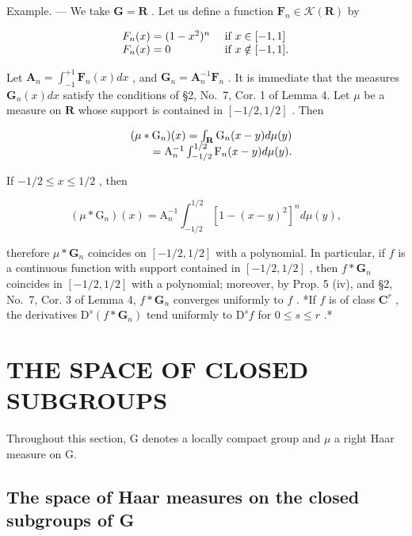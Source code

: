 Example. --- We take \(\mathbf{G} = \mathbf{R}\) . Let us define a function \(\mathbf{F}_n \in \mathcal{K}(\mathbf{R})\) by

\[
\begin{array}{l l} F _ {n} (x) = (1 - x ^ {2}) ^ {n} & \text { if } x \in [ - 1, 1 ] \\ F _ {n} (x) = 0 & \text { if } x \notin [ - 1, 1 ]. \end{array}
\]

Let \(\mathbf{A}_n = \int_{-1}^{+1}\mathbf{F}_n(x)dx\) , and \(\mathbf{G}_n = \mathbf{A}_n^{-1}\mathbf{F}_n\) . It is immediate that the measures \(\mathbf{G}_n(x)dx\) satisfy the conditions of §2, No.~7, Cor. 1 of Lemma 4. Let \(\mu\) be a measure on \(\mathbf{R}\) whose support is contained in \([-1/2, 1/2]\) . Then

\[
\begin{array}{r l} & {(\mu * \mathrm{G} _ {n}) (x) = \int_ {\mathbf {R}} \mathrm{G} _ {n} (x - y) d \mu (y)} \\ & {\qquad = \mathrm{A} _ {n} ^ {- 1} \int_ {- 1 / 2} ^ {1 / 2} \mathrm{F} _ {n} (x - y) d \mu (y).} \end{array}
\]

If \(-1 / 2\leqslant x\leqslant 1 / 2\) , then

\[
(\mu * \mathrm{G} _ {n}) (x) = \mathrm{A} _ {n} ^ {- 1} \int_ {- 1 / 2} ^ {1 / 2} [ 1 - (x - y) ^ {2} ] ^ {n} d \mu (y),
\]

therefore \(\mu * \mathbf{G}_n\) coincides on \([-1/2, 1/2]\) with a polynomial. In particular, if \(f\) is a continuous function with support contained in \([-1/2, 1/2]\) , then \(f * \mathbf{G}_n\) coincides in \([-1/2, 1/2]\) with a polynomial; moreover, by Prop. 5 (iv), and §2, No.~7, Cor. 3 of Lemma 4, \(f * \mathbf{G}_n\) converges uniformly to \(f\) . *If \(f\) is of class \(\mathbf{C}^r\) , the derivatives \(\mathrm{D}^s(f * \mathbf{G}_n)\) tend uniformly to \(\mathrm{D}^s f\) for \(0 \leqslant s \leqslant r\) .*

\section{THE SPACE OF CLOSED SUBGROUPS}

Throughout this section, G denotes a locally compact group and \(\mu\) a right Haar measure on G.

\subsection{The space of Haar measures on the closed subgroups of G}

